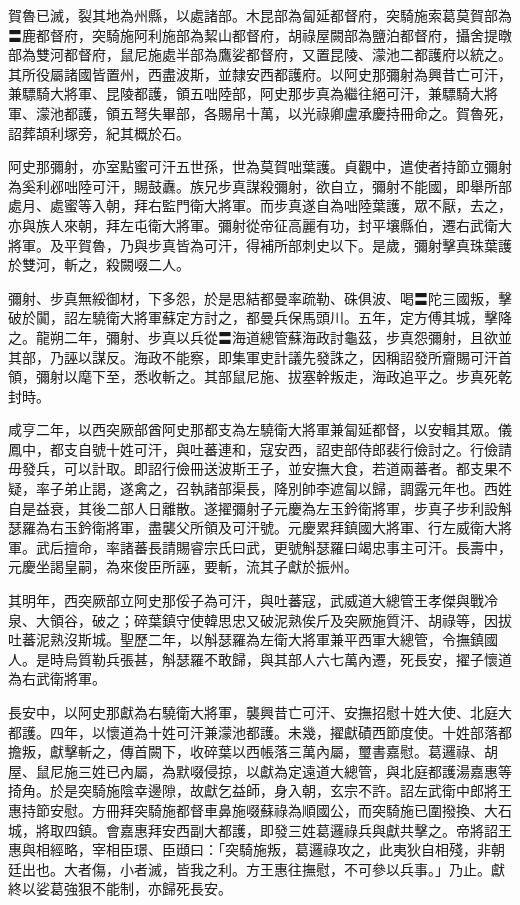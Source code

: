 \begin{pinyinscope}
 賀魯已滅，裂其地為州縣，以處諸部。木昆部為匐延都督府，突騎施索葛莫賀部為〓鹿都督府，突騎施阿利施部為絜山都督府，胡祿屋闕部為鹽泊都督府，攝舍提暾部為雙河都督府，鼠尼施處半部為鷹娑都督府，又置昆陵、濛池二都護府以統之。其所役屬諸國皆置州，西盡波斯，並隸安西都護府。以阿史那彌射為興昔亡可汗，兼驃騎大將軍、昆陵都護，領五咄陸部，阿史那步真為繼往絕可汗，兼驃騎大將軍、濛池都護，領五弩失畢部，各賜帛十萬，以光祿卿盧承慶持冊命之。賀魯死，詔葬頡利塚旁，紀其概於石。



 阿史那彌射，亦室點蜜可汗五世孫，世為莫賀咄葉護。貞觀中，遣使者持節立彌射為奚利邲咄陸可汗，賜鼓纛。族兄步真謀殺彌射，欲自立，彌射不能國，即舉所部處月、處蜜等入朝，拜右監門衛大將軍。而步真遂自為咄陸葉護，眾不厭，去之，亦與族人來朝，拜左屯衛大將軍。彌射從帝征高麗有功，封平壤縣伯，遷右武衛大將軍。及平賀魯，乃與步真皆為可汗，得補所部刺史以下。是歲，彌射擊真珠葉護於雙河，斬之，殺闕啜二人。



 彌射、步真無綏御材，下多怨，於是思結都曼率疏勒、硃俱波、喝〓陀三國叛，擊破於闐，詔左驍衛大將軍蘇定方討之，都曼兵保馬頭川。五年，定方傅其城，擊降之。龍朔二年，彌射、步真以兵從〓海道總管蘇海政討龜茲，步真怨彌射，且欲並其部，乃誣以謀反。海政不能察，即集軍吏計議先發誅之，因稱詔發所齎賜可汗首領，彌射以麾下至，悉收斬之。其部鼠尼施、拔塞幹叛走，海政追平之。步真死乾封時。



 咸亨二年，以西突厥部酋阿史那都支為左驍衛大將軍兼匐延都督，以安輯其眾。儀鳳中，都支自號十姓可汗，與吐蕃連和，寇安西，詔吏部侍郎裴行儉討之。行儉請毋發兵，可以計取。即詔行儉冊送波斯王子，並安撫大食，若道兩蕃者。都支果不疑，率子弟止謁，遂禽之，召執諸部渠長，降別帥李遮匐以歸，調露元年也。西姓自是益衰，其後二部人日離散。遂擢彌射子元慶為左玉鈐衛將軍，步真子步利設斛瑟羅為右玉鈐衛將軍，盡襲父所領及可汗號。元慶累拜鎮國大將軍、行左威衛大將軍。武后擅命，率諸蕃長請賜睿宗氏曰武，更號斛瑟羅曰竭忠事主可汗。長壽中，元慶坐謁皇嗣，為來俊臣所誣，要斬，流其子獻於振州。



 其明年，西突厥部立阿史那俀子為可汗，與吐蕃寇，武威道大總管王孝傑與戰冷泉、大領谷，破之；碎葉鎮守使韓思忠又破泥熟俟斤及突厥施質汗、胡祿等，因拔吐蕃泥熟沒斯城。聖歷二年，以斛瑟羅為左衛大將軍兼平西軍大總管，令撫鎮國人。是時烏質勒兵張甚，斛瑟羅不敢歸，與其部人六七萬內遷，死長安，擢子懷道為右武衛將軍。



 長安中，以阿史那獻為右驍衛大將軍，襲興昔亡可汗、安撫招慰十姓大使、北庭大都護。四年，以懷道為十姓可汗兼濛池都護。未幾，擢獻磧西節度使。十姓部落都擔叛，獻擊斬之，傳首闕下，收碎葉以西帳落三萬內屬，璽書嘉慰。葛邏祿、胡屋、鼠尼施三姓已內屬，為默啜侵掠，以獻為定遠道大總管，與北庭都護湯嘉惠等掎角。於是突騎施陰幸邊隙，故獻乞益師，身入朝，玄宗不許。詔左武衛中郎將王惠持節安慰。方冊拜突騎施都督車鼻施啜蘇祿為順國公，而突騎施已圍撥換、大石城，將取四鎮。會嘉惠拜安西副大都護，即發三姓葛邏祿兵與獻共擊之。帝將詔王惠與相經略，宰相臣璟、臣頲曰：「突騎施叛，葛邏祿攻之，此夷狄自相殘，非朝廷出也。大者傷，小者滅，皆我之利。方王惠往撫慰，不可參以兵事。」乃止。獻終以娑葛強狠不能制，亦歸死長安。




\end{pinyinscope}

